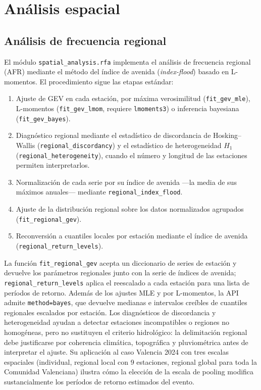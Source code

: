 \section{Análisis espacial}

\subsection{Análisis de frecuencia regional}

El módulo \texttt{spatial\_analysis.rfa} implementa el análisis de frecuencia regional (AFR) mediante el método del índice de avenida (\emph{index-flood}) \parencite{hosking1997rfa} basado en L-momentos. El procedimiento sigue las etapas estándar:
\begin{enumerate}
  \item Ajuste de GEV en cada estación, por máxima verosimilitud (\texttt{fit\_gev\_mle}), L-momentos (\texttt{fit\_gev\_lmom}, requiere \texttt{lmoments3}) o inferencia bayesiana (\texttt{fit\_gev\_bayes}).
  \item Diagnóstico regional mediante el estadístico de discordancia de Hosking--Wallis (\texttt{regional\_discordancy}) y el estadístico de heterogeneidad $H_1$ (\texttt{regional\_heterogeneity}), cuando el número y longitud de las estaciones permiten interpretarlos.
  \item Normalización de cada serie por su índice de avenida —la media de sus máximos anuales— mediante \texttt{regional\_index\_flood}.
  \item Ajuste de la distribución regional sobre los datos normalizados agrupados (\texttt{fit\_regional\_gev}).
  \item Reconversión a cuantiles locales por estación mediante el índice de avenida (\texttt{regional\_return\_levels}).
\end{enumerate}

La función \texttt{fit\_regional\_gev} acepta un diccionario de series de estación y devuelve los parámetros regionales junto con la serie de índices de avenida; \texttt{regional\_return\_levels} aplica el reescalado a cada estación para una lista de períodos de retorno. Además de los ajustes MLE y por L-momentos, la API admite \texttt{method=\textquotesingle{}bayes\textquotesingle{}}, que devuelve medianas e intervalos creíbles de cuantiles regionales escalados por estación. Los diagnósticos de discordancia y heterogeneidad ayudan a detectar estaciones incompatibles o regiones no homogéneas, pero no sustituyen el criterio hidrológico: la delimitación regional debe justificarse por coherencia climática, topográfica y pluviométrica antes de interpretar el ajuste. Su aplicación al caso Valencia 2024 \parencite{navas2025valenciaIA} con tres escalas espaciales (individual, regional local con 9 estaciones, regional global para toda la Comunidad Valenciana) ilustra cómo la elección de la escala de pooling modifica sustancialmente los períodos de retorno estimados del evento.

